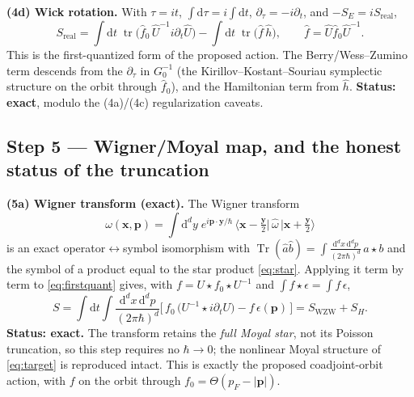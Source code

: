 \documentclass[11pt]{article}
\theoremstyle{remark}
\begin{document}
\medskip
\noindent\textbf{(4d) Wick rotation.} With $\tau=it$, $\int\mathrm{d}\tau=i\int\mathrm{d}t$,
$\partial_\tau=-i\partial_t$, and $-S_E=iS_{\mathrm{real}}$,
\begin{equation}
\label{eq:firstquant}
\boxed{\;
S_{\mathrm{real}}=\int\mathrm{d}t\;\operatorname{tr}\!\big(\hat f_0\,\hat U^{-1}i\partial_t\hat U\big)
-\int\mathrm{d}t\;\operatorname{tr}\!\big(\hat f\,\hat h\big),
\qquad \hat f=\hat U\hat f_0\hat U^{-1}.\;}
\end{equation}
This is the first-quantized form of the proposed action. The Berry/Wess--Zumino term
descends from the $\partial_\tau$ in $G_0^{-1}$ (the Kirillov--Kostant--Souriau symplectic
structure on the orbit through $\hat f_0$), and the Hamiltonian term from $\hat h$.
\textbf{Status: exact}, modulo the (4a)/(4c) regularization caveats.

\subsection*{Step 5 --- Wigner/Moyal map, and the honest status of the truncation}

\noindent\textbf{(5a) Wigner transform (exact).} The Wigner transform
\[
\omega(\boldsymbol{x},\boldsymbol{p})=\int\mathrm{d}^dy\;e^{i\boldsymbol{p}\cdot\boldsymbol{y}/\hbar}\,
\big\langle\boldsymbol{x}-\tfrac{\boldsymbol{y}}{2}\big|\,\hat\omega\,\big|\boldsymbol{x}+\tfrac{\boldsymbol{y}}{2}\big\rangle
\]
is an exact operator$\leftrightarrow$symbol isomorphism with
$\operatorname{Tr}(\hat a\hat b)=\int\frac{\mathrm{d}^dx\,\mathrm{d}^dp}{(2\pi\hbar)^d}\,a\star b$
and the symbol of a product equal to the star product \eqref{eq:star}. Applying it term by
term to \eqref{eq:firstquant} gives, with $f=U\star f_0\star U^{-1}$ and
$\int f\star\epsilon=\int f\,\epsilon$,
\begin{equation}
\label{eq:final}
\boxed{\;
S=\int\mathrm{d}t\int\frac{\mathrm{d}^dx\,\mathrm{d}^dp}{(2\pi\hbar)^d}
\Big[\,f_0\,\big(U^{-1}\!\star i\partial_t U\big)-f\,\epsilon(\boldsymbol{p})\,\Big]
=S_{\mathrm{WZW}}+S_H.\;}
\end{equation}
\textbf{Status: exact.} The transform retains the \emph{full Moyal star}, not its Poisson
truncation, so this step requires no $\hbar\to0$; the nonlinear Moyal structure of
\eqref{eq:target} is reproduced intact. This is exactly the proposed coadjoint-orbit
action, with $f$ on the orbit through $f_0=\Theta(p_F-|\boldsymbol{p}|)$.
\end{document}
